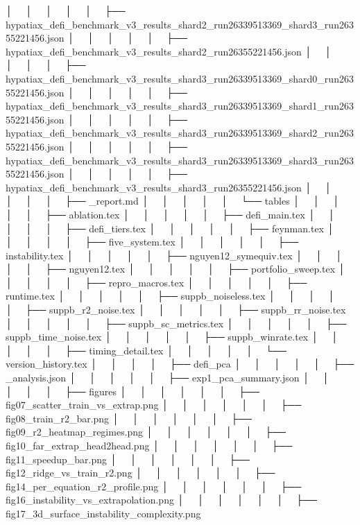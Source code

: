 │   │       │   │       │   ├── hypatiax_defi_benchmark_v3_results_shard2_run26339513369_shard3_run26355221456.json
│   │       │   │       │   ├── hypatiax_defi_benchmark_v3_results_shard2_run26355221456.json
│   │       │   │       │   ├── hypatiax_defi_benchmark_v3_results_shard3_run26339513369_shard0_run26355221456.json
│   │       │   │       │   ├── hypatiax_defi_benchmark_v3_results_shard3_run26339513369_shard1_run26355221456.json
│   │       │   │       │   ├── hypatiax_defi_benchmark_v3_results_shard3_run26339513369_shard2_run26355221456.json
│   │       │   │       │   ├── hypatiax_defi_benchmark_v3_results_shard3_run26339513369_shard3_run26355221456.json
│   │       │   │       │   ├── hypatiax_defi_benchmark_v3_results_shard3_run26355221456.json
│   │       │   │       │   ├── _report.md
│   │       │   │       │   └── tables
│   │       │   │       │       ├── ablation.tex
│   │       │   │       │       ├── defi_main.tex
│   │       │   │       │       ├── defi_tiers.tex
│   │       │   │       │       ├── feynman.tex
│   │       │   │       │       ├── five_system.tex
│   │       │   │       │       ├── instability.tex
│   │       │   │       │       ├── nguyen12_symequiv.tex
│   │       │   │       │       ├── nguyen12.tex
│   │       │   │       │       ├── portfolio_sweep.tex
│   │       │   │       │       ├── repro_macros.tex
│   │       │   │       │       ├── runtime.tex
│   │       │   │       │       ├── suppb_noiseless.tex
│   │       │   │       │       ├── suppb_r2_noise.tex
│   │       │   │       │       ├── suppb_rr_noise.tex
│   │       │   │       │       ├── suppb_sc_metrics.tex
│   │       │   │       │       ├── suppb_time_noise.tex
│   │       │   │       │       ├── suppb_winrate.tex
│   │       │   │       │       ├── timing_detail.tex
│   │       │   │       │       └── version_history.tex
│   │       │   │       ├── defi_pca
│   │       │   │       │   ├── _analysis.json
│   │       │   │       │   ├── exp1_pca_summary.json
│   │       │   │       │   ├── figures
│   │       │   │       │   │   ├── fig07_scatter_train_vs_extrap.png
│   │       │   │       │   │   ├── fig08_train_r2_bar.png
│   │       │   │       │   │   ├── fig09_r2_heatmap_regimes.png
│   │       │   │       │   │   ├── fig10_far_extrap_head2head.png
│   │       │   │       │   │   ├── fig11_speedup_bar.png
│   │       │   │       │   │   ├── fig12_ridge_vs_train_r2.png
│   │       │   │       │   │   ├── fig14_per_equation_r2_profile.png
│   │       │   │       │   │   ├── fig16_instability_vs_extrapolation.png
│   │       │   │       │   │   ├── fig17_3d_surface_instability_complexity.png
